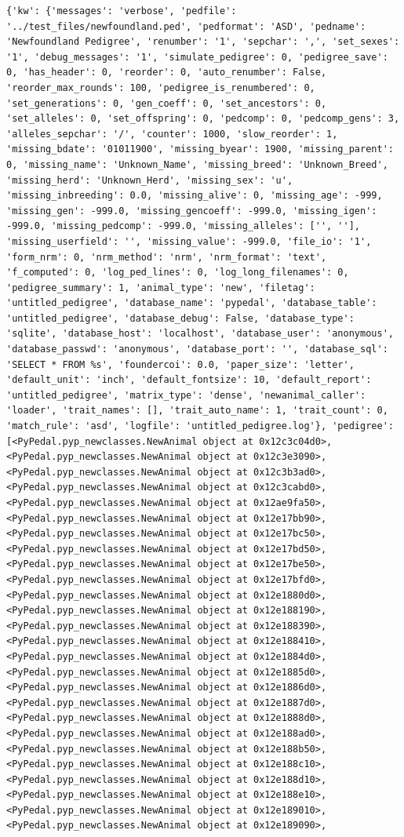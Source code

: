 \documentclass[
  letterpaper,
  DIV=11,
  numbers=noendperiod]{scrreprt}
\begin{document}
\begin{codelisting}
{\begin{verbatim}
{'kw': {'messages': 'verbose', 'pedfile': '../test_files/newfoundland.ped', 'pedformat': 'ASD', 'pedname': 'Newfoundland Pedigree', 'renumber': '1', 'sepchar': ',', 'set_sexes': '1', 'debug_messages': '1', 'simulate_pedigree': 0, 'pedigree_save': 0, 'has_header': 0, 'reorder': 0, 'auto_renumber': False, 'reorder_max_rounds': 100, 'pedigree_is_renumbered': 0, 'set_generations': 0, 'gen_coeff': 0, 'set_ancestors': 0, 'set_alleles': 0, 'set_offspring': 0, 'pedcomp': 0, 'pedcomp_gens': 3, 'alleles_sepchar': '/', 'counter': 1000, 'slow_reorder': 1, 'missing_bdate': '01011900', 'missing_byear': 1900, 'missing_parent': 0, 'missing_name': 'Unknown_Name', 'missing_breed': 'Unknown_Breed', 'missing_herd': 'Unknown_Herd', 'missing_sex': 'u', 'missing_inbreeding': 0.0, 'missing_alive': 0, 'missing_age': -999, 'missing_gen': -999.0, 'missing_gencoeff': -999.0, 'missing_igen': -999.0, 'missing_pedcomp': -999.0, 'missing_alleles': ['', ''], 'missing_userfield': '', 'missing_value': -999.0, 'file_io': '1', 'form_nrm': 0, 'nrm_method': 'nrm', 'nrm_format': 'text', 'f_computed': 0, 'log_ped_lines': 0, 'log_long_filenames': 0, 'pedigree_summary': 1, 'animal_type': 'new', 'filetag': 'untitled_pedigree', 'database_name': 'pypedal', 'database_table': 'untitled_pedigree', 'database_debug': False, 'database_type': 'sqlite', 'database_host': 'localhost', 'database_user': 'anonymous', 'database_passwd': 'anonymous', 'database_port': '', 'database_sql': 'SELECT * FROM %s', 'foundercoi': 0.0, 'paper_size': 'letter', 'default_unit': 'inch', 'default_fontsize': 10, 'default_report': 'untitled_pedigree', 'matrix_type': 'dense', 'newanimal_caller': 'loader', 'trait_names': [], 'trait_auto_name': 1, 'trait_count': 0, 'match_rule': 'asd', 'logfile': 'untitled_pedigree.log'}, 'pedigree': [<PyPedal.pyp_newclasses.NewAnimal object at 0x12c3c04d0>, <PyPedal.pyp_newclasses.NewAnimal object at 0x12c3e3090>, <PyPedal.pyp_newclasses.NewAnimal object at 0x12c3b3ad0>, <PyPedal.pyp_newclasses.NewAnimal object at 0x12c3cabd0>, <PyPedal.pyp_newclasses.NewAnimal object at 0x12ae9fa50>, <PyPedal.pyp_newclasses.NewAnimal object at 0x12e17bb90>, <PyPedal.pyp_newclasses.NewAnimal object at 0x12e17bc50>, <PyPedal.pyp_newclasses.NewAnimal object at 0x12e17bd50>, <PyPedal.pyp_newclasses.NewAnimal object at 0x12e17be50>, <PyPedal.pyp_newclasses.NewAnimal object at 0x12e17bfd0>, <PyPedal.pyp_newclasses.NewAnimal object at 0x12e1880d0>, <PyPedal.pyp_newclasses.NewAnimal object at 0x12e188190>, <PyPedal.pyp_newclasses.NewAnimal object at 0x12e188390>, <PyPedal.pyp_newclasses.NewAnimal object at 0x12e188410>, <PyPedal.pyp_newclasses.NewAnimal object at 0x12e1884d0>, <PyPedal.pyp_newclasses.NewAnimal object at 0x12e1885d0>, <PyPedal.pyp_newclasses.NewAnimal object at 0x12e1886d0>, <PyPedal.pyp_newclasses.NewAnimal object at 0x12e1887d0>, <PyPedal.pyp_newclasses.NewAnimal object at 0x12e1888d0>, <PyPedal.pyp_newclasses.NewAnimal object at 0x12e188ad0>, <PyPedal.pyp_newclasses.NewAnimal object at 0x12e188b50>, <PyPedal.pyp_newclasses.NewAnimal object at 0x12e188c10>, <PyPedal.pyp_newclasses.NewAnimal object at 0x12e188d10>, <PyPedal.pyp_newclasses.NewAnimal object at 0x12e188e10>, <PyPedal.pyp_newclasses.NewAnimal object at 0x12e189010>, <PyPedal.pyp_newclasses.NewAnimal object at 0x12e189090>, 
\end{verbatim}}
\end{codelisting}
\end{document}
